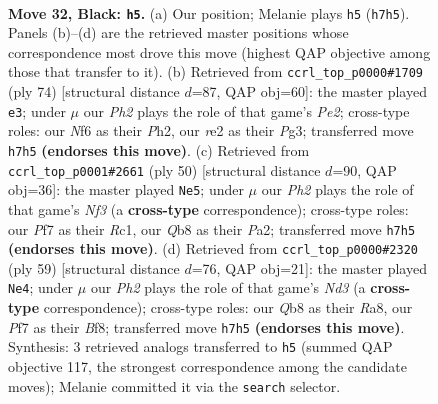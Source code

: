 \documentclass[11pt]{article}
\begin{document}
\clearpage

\begin{figure}[p]\centering
\begin{subfigure}{0.46\textwidth}\centering
\resizebox{\linewidth}{!}{%
\newchessgame
\chessboard[
  setfen={1qb5/r4pkp/2B2np1/6N1/P7/1p4P1/3NRP1P/R5K1 b - - 1 32},
  showmover=false,
  pgfstyle=straightmove, color=movearrow, markmove={h7-h5}
]}
\caption{}
\end{subfigure}\hfill
\begin{subfigure}{0.46\textwidth}\centering
\resizebox{\linewidth}{!}{%
\newchessgame
\chessboard[
  setfen={1r6/bp1rnpkp/5p2/2Pp4/3P4/1R4P1/4PPKP/1Q6 w - - 23 38},
  showmover=false,
  pgfstyle=straightmove, color=movearrow, markmove={e2-e3}
]}
\caption{}
\end{subfigure}
\\[4pt]
\begin{subfigure}{0.46\textwidth}\centering
\resizebox{\linewidth}{!}{%
\newchessgame
\chessboard[
  setfen={3q2k1/p1p1rpp1/7p/6n1/2QP4/4PN2/P4KPP/2R5 w - - 1 26},
  showmover=false,
  pgfstyle=straightmove, color=movearrow, markmove={f3-e5}
]}
\caption{}
\end{subfigure}\hfill
\begin{subfigure}{0.46\textwidth}\centering
\resizebox{\linewidth}{!}{%
\newchessgame
\chessboard[
  setfen={r4bk1/1q3pp1/3n3p/p1BpN3/8/P6P/1P3PP1/3QR1K1 b - - 3 30},
  showmover=false,
  pgfstyle=straightmove, color=movearrow, markmove={d6-e4}
]}
\caption{}
\end{subfigure}
\caption{\textbf{Move 32, Black: \texttt{h5}.} (a) Our position; Melanie plays \texttt{h5} (\texttt{h7h5}). Panels (b)--(d) are the retrieved master positions whose correspondence most drove this move (highest QAP objective among those that transfer to it). (b) Retrieved from \texttt{ccrl\_top\_p0000\#1709} (ply 74) [structural distance $d$=87, QAP obj=60]: the master played \texttt{e3}; under $\mu$ our \emph{Ph2} plays the role of that game's \emph{Pe2}; cross-type roles: our \emph{N}f6 as their \emph{P}h2, our \emph{r}e2 as their \emph{P}g3; transferred move \texttt{h7h5} \textbf{(endorses this move)}. (c) Retrieved from \texttt{ccrl\_top\_p0001\#2661} (ply 50) [structural distance $d$=90, QAP obj=36]: the master played \texttt{Ne5}; under $\mu$ our \emph{Ph2} plays the role of that game's \emph{Nf3} (a \textbf{cross-type} correspondence); cross-type roles: our \emph{P}f7 as their \emph{R}c1, our \emph{Q}b8 as their \emph{P}a2; transferred move \texttt{h7h5} \textbf{(endorses this move)}. (d) Retrieved from \texttt{ccrl\_top\_p0000\#2320} (ply 59) [structural distance $d$=76, QAP obj=21]: the master played \texttt{Ne4}; under $\mu$ our \emph{Ph2} plays the role of that game's \emph{Nd3} (a \textbf{cross-type} correspondence); cross-type roles: our \emph{Q}b8 as their \emph{R}a8, our \emph{P}f7 as their \emph{B}f8; transferred move \texttt{h7h5} \textbf{(endorses this move)}. Synthesis: 3 retrieved analogs transferred to \texttt{h5} (summed QAP objective 117, the strongest correspondence among the candidate moves); Melanie committed it via the \texttt{search} selector.}
\label{fig:thought-m63}
\end{figure}
\end{document}
